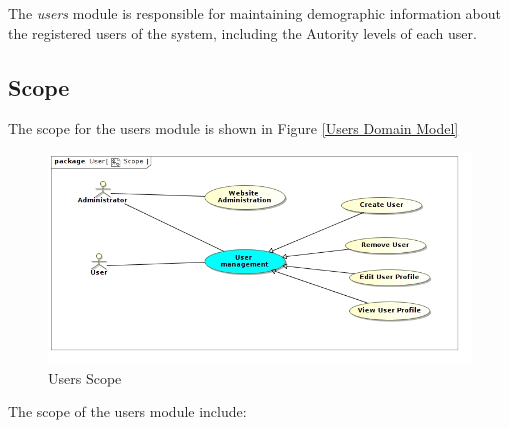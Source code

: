 The \textit{users} module is responsible for maintaining demographic information
about the registered users of the system, including the Autority levels of each
user.

\subsection{Scope}
The scope for the users module is shown in Figure \ref{Users Domain Model}
\begin{figure}[H]
  \begin{center}
  \includegraphics[scale=1.0]{../Diagrams and Charts/Users/Scope.jpg}  
  \caption{Users Scope}
  \end{center}
  \label{Users Scope}
\end{figure}
The scope of the users module include:
\begin{itemize}

\end{itemize}

